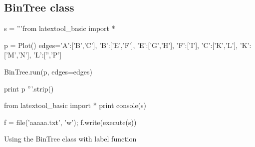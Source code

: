 \newpage
\subsection{BinTree class}

\begin{python}
s = '''from latextool_basic import *

p = Plot()
edges={'A':['B','C'],
       'B':['E','F'],
       'E':['G','H'],
       'F':['I'],
       'C':['K','L'],
       'K':['M','N'],
       'L':['','P']}

BinTree.run(p, edges=edges)
     
print p
'''.strip()

from latextool_basic import *
print console(s)

f = file('aaaaa.txt', 'w'); f.write(execute(s))
\end{python}




\newpage
Using the BinTree class with label function






